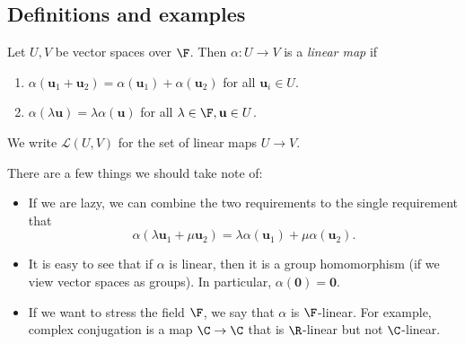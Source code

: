 \documentclass[a4paper]{article}
\begin{document}
\subsection{Definitions and examples}
\begin{defi}
  Let $U, V$ be vector spaces over $\F$. Then $\alpha: U\to V$ is a \emph{linear map} if
  \begin{enumerate}
    \item $\alpha(\mathbf{u}_1 + \mathbf{u}_2) = \alpha(\mathbf{u}_1) + \alpha(\mathbf{u}_2)$ for all $\mathbf{u}_i \in U$.
    \item $\alpha(\lambda \mathbf{u}) = \lambda \alpha (\mathbf{u})$ for all $\lambda \in \F, \mathbf{u}\in U$.
  \end{enumerate}
  We write $\mathcal{L}(U, V)$ for the set of linear maps $U\to V$.
\end{defi}
There are a few things we should take note of:
\begin{itemize}
  \item If we are lazy, we can combine the two requirements to the single requirement that
    \[
      \alpha (\lambda \mathbf{u}_1 + \mu \mathbf{u}_2) = \lambda \alpha(\mathbf{u}_1) + \mu \alpha(\mathbf{u}_2).
    \]
  \item It is easy to see that if $\alpha$ is linear, then it is a group homomorphism (if we view vector spaces as groups). In particular, $\alpha (\mathbf{0}) = \mathbf{0}$.
  \item If we want to stress the field $\F$, we say that $\alpha$ is $\F$-linear. For example, complex conjugation is a map $\C \to \C$ that is $\R$-linear but not $\C$-linear.
\end{itemize}
\end{document}

